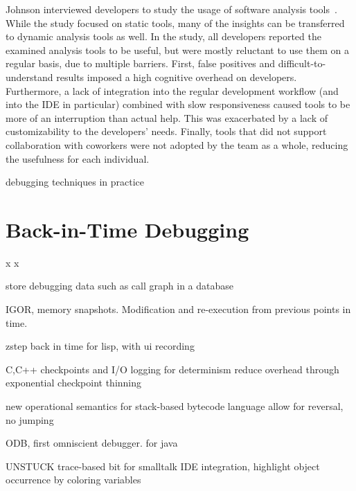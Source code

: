 Johnson \etal interviewed developers to study the usage of software analysis tools~\cite{johnson13:why_dont_software_developers}.
While the study focused on static tools, many of the insights can be transferred to dynamic analysis tools as well.
In the study, all developers reported the examined analysis tools to be useful, but were mostly reluctant to use them on a regular basis, due to multiple barriers.
First, false positives and difficult-to-understand results imposed a high cognitive overhead on developers.
Furthermore, a lack of integration into the regular development workflow (and into the IDE in particular) combined with slow responsiveness caused tools to be more of an interruption than actual help.
This was exacerbated by a lack of customizability to the developers' needs.
Finally, tools that did not support collaboration with coworkers were not adopted by the team as a whole, reducing the usefulness for each individual.

\cite{perscheid17:studying_the_advancement}
debugging techniques in practice

\section{Back-in-Time Debugging}
\label{sec:rw_bit_debugging}
x
\newpage
x
\newpage

\cite{powell83:a_database_model}
store debugging data such as call graph in a database

\cite{feldman88:igor_a_system}
IGOR, memory snapshots.
Modification and re-execution from previous points in time.

\cite{tolmach93:a_debugger_for_standard}

\cite{lieberman95:zstep_95_a_reversible}
zstep back in time for lisp, with ui recording

\cite{boothe00:efficient_algorithms_for_bidirectional}
C,C++
checkpoints and I/O logging for determinism
reduce overhead through exponential checkpoint thinning

\cite{cook02:reverse_execution_of_java}
new operational semantics for stack-based bytecode language
allow for reversal,
no jumping

\cite{lewis03:debugging_backwards_in_time}
ODB, first omniscient debugger. for java

\cite{hofer06:design_and_implementation}
UNSTUCK trace-based bit for smalltalk
IDE integration, highlight object occurrence by coloring variables

